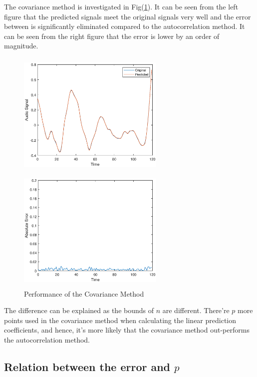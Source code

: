 \documentclass[preprint,12pt]{elsarticle}
\begin{document}
The covariance method is investigated in Fig(\ref{fig:performance_cov}). It can be seen from the left figure that the predicted signals meet the original signals very well and the error between is significantly eliminated compared to the autocorrelation method. It can be seen from the right figure that the error is lower by an order of magnitude.

\begin{figure}[!htbp]\centering	
	\begin{minipage}{6.5cm}
		\centering
		\includegraphics[height=6cm,width=7cm]{../pic/covariance_120_6.eps}
	\end{minipage}
	\begin{minipage}{6.5cm}
		\centering
		\includegraphics[height=6cm,width=7cm]{../pic/covariance_err_120_6.eps}
	\end{minipage}
	\caption{Performance of the Covariance Method}\label{fig:performance_cov}
\end{figure}

The difference can be explained as the bounds of $n$ are different. There're $p$ more points used in the covariance method when calculating the linear prediction coefficients, and hence, it's more likely that the covariance method out-performs the autocorrelation method.

\subsection{Relation between the error and $p$}
\end{document}
